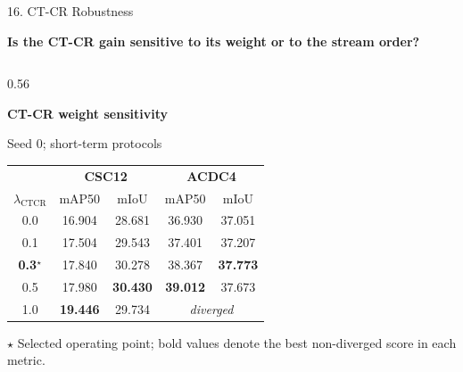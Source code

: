 \documentclass[aspectratio=169,11pt]{beamer}
\begin{document}
\begin{frame}{16. CT-CR Robustness}

\fontsize{7.2}{7.8}\selectfont

\textbf{Is the CT-CR gain sensitive to its weight or to the stream order?}

\vspace{0.05cm}

\begin{columns}[T,onlytextwidth]

\begin{column}{0.56\textwidth}

\textbf{CT-CR weight sensitivity}

\vspace{0.02cm}

{\fontsize{6.7}{7.2}\selectfont Seed 0; short-term protocols}

\vspace{0.03cm}

\centering

\fontsize{6.6}{7.1}\selectfont
\setlength{\tabcolsep}{3.0pt}
\renewcommand{\arraystretch}{1.00}

\begin{tabular}{c|cc|cc}
\toprule
&
\multicolumn{2}{c|}{\textbf{CSC12}}
&
\multicolumn{2}{c}{\textbf{ACDC4}}
\\

$\lambda_{\mathrm{CTCR}}$
& mAP50 & mIoU
& mAP50 & mIoU
\\
\midrule

0.0
& 16.904
& 28.681
& 36.930
& 37.051
\\

0.1
& 17.504
& 29.543
& 37.401
& 37.207
\\

\textbf{0.3}$^{\star}$
& 17.840
& 30.278
& 38.367
& \textbf{37.773}
\\

0.5
& 17.980
& \textbf{30.430}
& \textbf{39.012}
& 37.673
\\

1.0
& \textbf{19.446}
& 29.734
& \multicolumn{2}{c}{\textit{diverged}}
\\

\bottomrule
\end{tabular}

\vspace{0.01cm}

{\fontsize{5.3}{5.8}\selectfont
$\star$ Selected operating point; bold values denote the best
non-diverged score in each metric.
}


\end{column}
\end{columns}
\end{frame}
\end{document}
